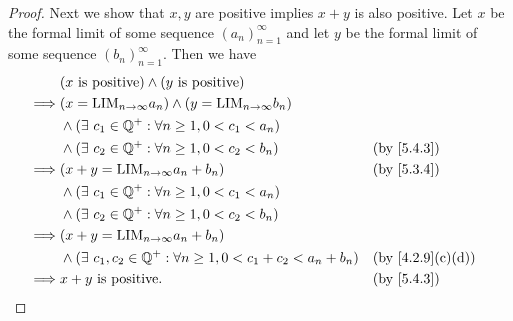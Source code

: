 \begin{proof}
  Next we show that \(x, y\) are positive implies \(x + y\) is also positive.
  Let \(x\) be the formal limit of some sequence \((a_n)_{n = 1}^{\infty}\) and let \(y\) be the formal limit of some sequence \((b_n)_{n = 1}^{\infty}\).
  Then we have
  \begin{align*}
             & (x \text{ is positive}) \land (y \text{ is positive})                                                                \\
    \implies & (x = \text{LIM}_{n \to \infty} a_n) \land (y = \text{LIM}_{n \to \infty} b_n)                                        \\
             & \land (\exists\ c_1 \in \Q^+ : \forall n \geq 1, 0 < c_1 < a_n)                                                      \\
             & \land (\exists\ c_2 \in \Q^+ : \forall n \geq 1, 0 < c_2 < b_n)                  &  & \text{(by \cref{5.4.3})}       \\
    \implies & (x + y = \text{LIM}_{n \to \infty} a_n + b_n)                                    &  & \text{(by \cref{5.3.4})}       \\
             & \land (\exists\ c_1 \in \Q^+ : \forall n \geq 1, 0 < c_1 < a_n)                                                      \\
             & \land (\exists\ c_2 \in \Q^+ : \forall n \geq 1, 0 < c_2 < b_n)                                                      \\
    \implies & (x + y = \text{LIM}_{n \to \infty} a_n + b_n)                                                                        \\
             & \land (\exists\ c_1, c_2 \in \Q^+ : \forall n \geq 1, 0 < c_1 + c_2 < a_n + b_n) &  & \text{(by \cref{4.2.9}(c)(d))} \\
    \implies & x + y \text{ is positive}.                                                       &  & \text{(by \cref{5.4.3})}
  \end{align*}


\end{proof}
